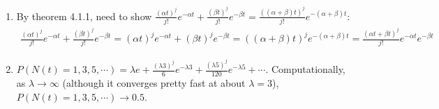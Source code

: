 \documentclass{article}
\begin{document}
\begin{enumerate}
\begin{displaymath}
\begin{array}{ccccc}
			1/2 & 1/2 & 0  & \dots \\
			1/3 & 1/3 & 1/3 & 0 & \dots \\
			\vdots & \ddots
			\end{array} \right)
		\end{displaymath}
		\begin{displaymath}
			\begin{array}{l}
			\Pi_0 = \Pi_1 = \frac{1}{2} \Pi_0 + \frac{1}{3} \Pi_1 + \frac{1}{4} \Pi_2 + \dots \\
			\Pi_2 = \frac{1}{3} \Pi_1 + \frac{1}{4} \Pi_2 + \dots \\
			\frac{1}{2} \Pi_0 = \frac{1}{3} \Pi_1 + \frac{1}{4} \Pi_2 + \dots \\
			\frac{1}{6} \Pi_0 = \frac{1}{4} \Pi_2 + \frac{1}{5} \Pi_3 + \dots \\
			\end{array}
		\end{displaymath}
	\item %
		By theorem 4.1.1, need to show $\frac{(\alpha t)^j}{j!} e^{-\alpha t} + \frac{(\beta t)^j}{j!} e^{-\beta t} = \frac{((\alpha + \beta) t)^j}{j!} e^{-(\alpha + \beta)t}$:
		\begin{displaymath} \begin{array}{l}
			\frac{(\alpha t)^j}{j!} e^{-\alpha t} + \frac{(\beta t)^j}{j!} e^{-\beta t} =
			(\alpha t)^j e^{-\alpha t} + (\beta t)^j e^{-\beta t} =
			((\alpha + \beta) t)^j e^{-(\alpha + \beta)t} =
			\frac{(\alpha t + \beta t)^j}{j!} e^{-\alpha t} e^{-\beta t}
		\end{array} \end{displaymath}
	\item %
		$P(N(t) = 1, 3, 5, \cdots) = \lambda e + \frac{(\lambda 3)^j}{6} e^{-\lambda 3} + \frac{(\lambda 5)^j}{120} e^{-\lambda 5} + \cdots$. Computationally, as $\lambda \rightarrow \infty$ (although it converges pretty fast at about $\lambda = 3$), $P(N(t) = 1, 3, 5, \cdots) \rightarrow 0.5$.
\end{enumerate}
\end{document}

